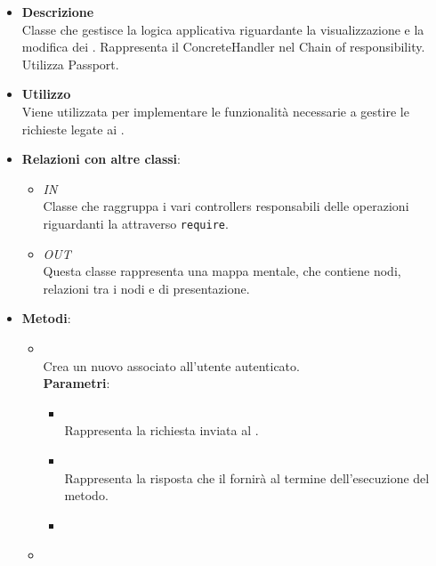 \FloatBarrier
\begin{itemize}
\item \textbf{Descrizione}\\
Classe che gestisce la logica applicativa riguardante la visualizzazione e la modifica dei . Rappresenta il ConcreteHandler nel  Chain of responsibility. Utilizza Passport.
\item \textbf{Utilizzo}\\
Viene utilizzata per implementare le funzionalità necessarie a gestire le richieste  legate ai .
\item \textbf{Relazioni con altre classi}:
\begin{itemize}
\item \textit{IN} \hyperref[\nogloxy{Premi::Back-End::App::Controllers::ProjectController}]{}\\
Classe che raggruppa i vari controllers responsabili delle operazioni riguardanti la  attraverso \texttt{require}.
\item \textit{OUT} \hyperref[\nogloxy{Premi::Back-End::App::Models::ProjectModel}]{}\\
Questa classe rappresenta una mappa mentale, che contiene nodi, relazioni tra i nodi e  di presentazione.
\end{itemize}
\item \textbf{Metodi}:
\begin{itemize}
\item {}
\\ Crea un nuovo  associato all’utente autenticato.
\\ \textbf{Parametri}:
\begin{itemize}
\item {}
\\ Rappresenta la richiesta inviata al .
\item {}
\\ Rappresenta la risposta che il  fornirà al termine dell’esecuzione del metodo.
\item {}
\\ \dpNext
\end{itemize}
\item {}

\end{itemize}
\end{itemize}
